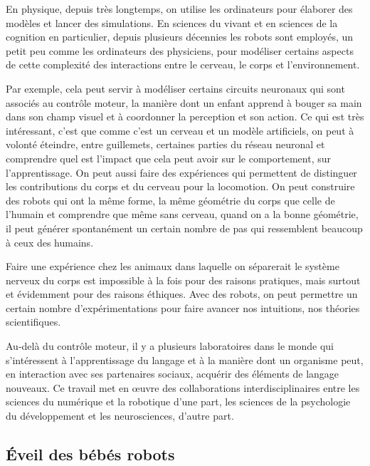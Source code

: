 En physique, depuis très longtemps, on utilise les ordinateurs pour élaborer des modèles et lancer des simulations. En sciences du vivant et en sciences de la cognition en particulier, depuis plusieurs décennies les robots sont employés, un petit peu comme les ordinateurs des physiciens, pour modéliser certains aspects de cette complexité des interactions entre le cerveau, le corps et l'environnement. 

Par exemple, cela peut servir à modéliser certains circuits neuronaux qui sont associés au contrôle moteur, la manière dont un enfant apprend à bouger sa main dans son champ visuel et à coordonner la perception et son action. Ce qui est très intéressant, c'est que comme c'est un cerveau et un modèle artificiels, on peut à volonté éteindre, entre guillemets, certaines parties du réseau neuronal et comprendre quel est l'impact que cela peut avoir sur le comportement, sur l'apprentissage. On peut aussi faire des expériences qui permettent de distinguer les contributions du corps et du cerveau pour la locomotion. On peut construire des robots qui ont la même forme, la même géométrie du corps que celle de l'humain et comprendre que même sans cerveau, quand on a la bonne géométrie, il peut générer spontanément un certain nombre de pas qui ressemblent beaucoup à ceux des humains. 

Faire une expérience chez les animaux dans laquelle on séparerait le système nerveux du corps est impossible à la fois pour des raisons pratiques, mais surtout et évidemment pour des raisons éthiques. Avec des robots, on peut permettre un certain nombre d'expérimentations pour faire avancer nos intuitions, nos théories scientifiques. 

Au-delà du contrôle moteur, il y a plusieurs laboratoires dans le monde qui s'intéressent à l'apprentissage du langage et à la manière dont un organisme peut, en interaction avec ses partenaires sociaux, acquérir des éléments de langage nouveaux. Ce travail met en œuvre des collaborations interdisciplinaires entre les sciences du numérique et la robotique d'une part, les sciences de la psychologie du développement et les neurosciences, d'autre part. 



\subsection[Éveil des bébés robots]{Éveil des bébés robots}
\label{sub:III.2.3}

